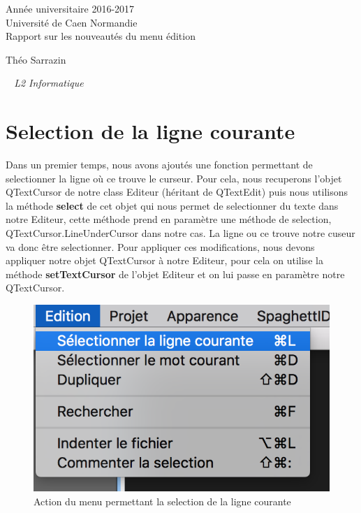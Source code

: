\documentclass[a4paper,12pt]{article}
\begin{document}
\begin{titlepage}
	\begin{center}
		\Large{Année universitaire 2016-2017}\\
		\Large{Université de Caen Normandie}\\[1cm]
		
		\huge{Rapport sur les nouveautés du menu édition}\\
		\vspace{3cm}
		
		Théo Sarrazin
		
	\normalsize{\textit{ ~ L2 Informatique}}\\
		\medskip
		\vspace{2cm}
				
	\end{center}
\end{titlepage}

\tableofcontents
\newpage

\section{Selection de la ligne courante}

	Dans un premier temps, nous avons ajoutés une fonction permettant de selectionner la ligne où ce trouve le curseur.
	Pour cela, nous recuperons l'objet QTextCursor de notre class Editeur (héritant de QTextEdit) puis nous utilisons la méthode \textbf{select} de cet objet qui nous permet de selectionner du texte dans notre Editeur, cette méthode prend en paramètre une méthode de selection, QTextCursor.LineUnderCursor dans notre cas. La ligne ou ce trouve notre cuseur va donc être selectionner.
	Pour appliquer ces modifications, nous devons appliquer notre objet QTextCursor à notre Editeur, pour cela on utilise la méthode \textbf{setTextCursor} de l'objet Editeur et on lui passe en paramètre notre QTextCursor.  


	\begin{figure}[h!]
		\begin{center}
			\includegraphics[scale=0.8]{imgs/utilisation_selection_ligne}
			\caption{Action du menu permettant la selection de la ligne courante}
		\end{center}
	\end{figure}
\end{document}

